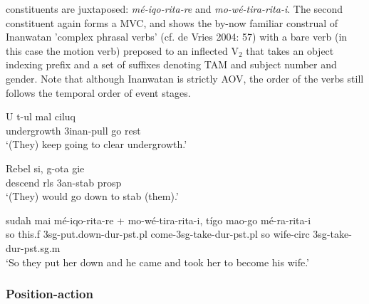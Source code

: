 constituents are juxtaposed: \textit{mé-iqo-rita-re} and \textit{mo-wé-tira-rita-i}. The second constituent again forms a MVC, and shows the by-now familiar construal of Inanwatan 'complex phrasal verbs' (cf. de Vries 2004: 57) with a bare verb (in this case the motion verb) preposed to an inflected V$_2$ that takes an object indexing prefix and a set of suffixes denoting TAM and subject number and gender. Note that although Inanwatan is strictly AOV, the order of the verbs still follows the temporal order of event stages.

\ea \label{Bunaq_60}
\gll U t-ul mal ciluq \\
undergrowth 3\acs{inan}-pull go rest \\
\glft ‘(They) keep going to clear undergrowth.’ \\ 
\z
\xe

\ea \label{Bunaq_n1}
\gll Rebel si, g-ota gie \\
descend \acs{rls} 3\acs{an}-stab \acs{prosp} \\
\glft ‘(They) would go down to stab (them).’ \\ 
\z
\xe

\ea \label{Inan_20}
\gll sudah mai mé-iqo-rita-re + mo-wé-tira-rita-i, tígo mao-go mé-ra-rita-i \\
so this.\acs{f} 3\acs{sg}-put.down-\acs{dur}-\acs{pst}.\acs{pl} come-3\acs{sg}-take-\acs{dur}-\acs{pst}.\acs{pl} so wife-\acs{circ} 3\acs{sg}-take-\acs{dur}-\acs{pst}.\acs{sg}.\acs{m} \\
\glft `So they put her down and he came and took her to become his wife.' \\ 
\z
\xe

\subsubsection{Position-action}\label{sec:position-action}

